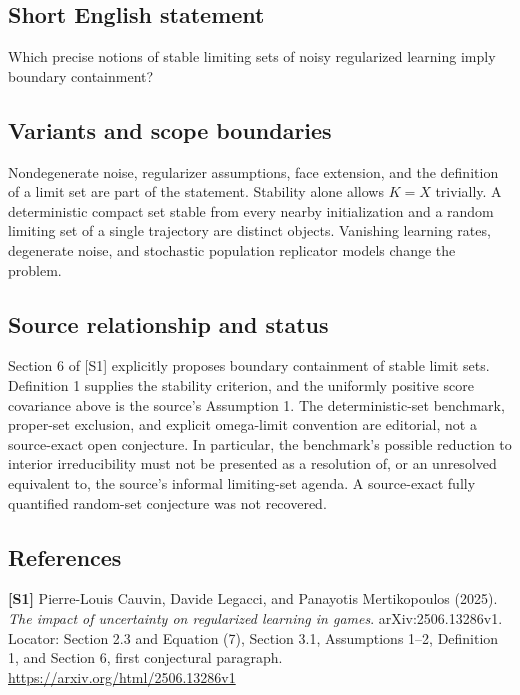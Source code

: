 \documentclass[11pt,a4paper]{article}
\begin{document}
\subsection*{Short English statement}
Which precise notions of stable limiting sets of noisy regularized learning imply boundary containment?
\subsection*{Variants and scope boundaries}
Nondegenerate noise, regularizer assumptions, face extension, and the definition of a limit set are part of the statement. Stability alone allows $K=X$ trivially. A deterministic compact set stable from every nearby initialization and a random limiting set of a single trajectory are distinct objects. Vanishing learning rates, degenerate noise, and stochastic population replicator models change the problem.
\subsection*{Source relationship and status}
Section 6 of [S1] explicitly proposes boundary containment of stable limit sets. Definition 1 supplies the stability criterion, and the uniformly positive score covariance above is the source's Assumption 1. The deterministic-set benchmark, proper-set exclusion, and explicit omega-limit convention are editorial, not a source-exact open conjecture. In particular, the benchmark's possible reduction to interior irreducibility must not be presented as a resolution of, or an unresolved equivalent to, the source's informal limiting-set agenda. A source-exact fully quantified random-set conjecture was not recovered.
\subsection*{References}
\begingroup\footnotesize\raggedright
{\footnotesize\raggedright
\textbf{[S1]} Pierre-Louis Cauvin, Davide Legacci, and Panayotis Mertikopoulos (2025). \emph{The impact of uncertainty on regularized learning in games}. arXiv:2506.13286v1. Locator: Section 2.3 and Equation (7), Section 3.1, Assumptions 1--2, Definition 1, and Section 6, first conjectural paragraph. \url{https://arxiv.org/html/2506.13286v1}\par}


\par\endgroup
\end{document}
